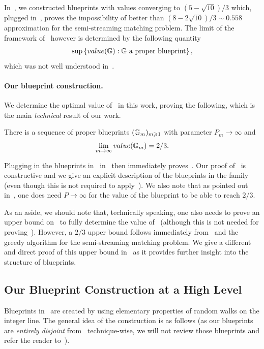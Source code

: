 In~\cite{AssadiJX26}, we constructed blueprints with values converging to $(5-\sqrt{10})/3$ which, plugged in~, proves the impossibility of better than $(8-2\sqrt{10})/3 \sim 0.558$ approximation
for the semi-streaming matching problem. The limit of the framework of~\cite{AssadiJX26} however is determined by the following quantity
\begin{align}
\sup\left\{ value(\mathbb{G}):\text{$\mathbb{G}$ a proper blueprint} \right\},  \label{eq:sup}
\end{align}
which was not well understood in~\cite{AssadiJX26}. 

\paragraph{Our blueprint construction.} 
We determine the optimal value of~ in this work, proving the following, which is the main \emph{technical} result of our work. 
\begin{theorem}\label{thm:blueprint}
	There is a sequence of proper blueprints $(\mathbb{G}_m)_{m \geqslant 1}$ with parameter $P_m \to \infty$ and 
	\[
		\lim_{m \to \infty} value(\mathbb{G}_m) = 2/3.
	\] 
\end{theorem}

Plugging in the blueprints in~ in~ then immediately proves~. Our proof of~ is  constructive and we 
give an explicit description of the blueprints in the family (even though this is not required to apply~). We also note that as pointed out in~\cite{AssadiJX26}, 
one does need $P \to \infty$ for the value of the blueprint to be able to reach $2/3$. 


As an aside, we should note that, technically speaking, one also needs to prove an upper bound on~ to fully determine the value of~ (although this is not needed for proving~). However, a $2/3$ upper bound follows 
immediately from~ and the greedy algorithm for the semi-streaming matching problem. We give a different and direct proof of this upper bound in~ as it provides further insight into the structure of blueprints. 


\subsection{Our Blueprint Construction at a High Level}\label{sec:ideas} 

Blueprints in~ are created by using elementary properties of random walks on the integer line. The general idea of the construction is as follows (as our blueprints 
are \emph{entirely disjoint} from~\cite{AssadiJX26} technique-wise, we will not review those blueprints and refer the reader to~\cite{AssadiJX26}). 

